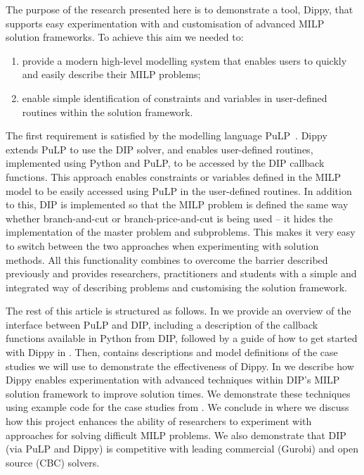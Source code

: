 The purpose of the research presented here is to demonstrate a tool, Dippy, that supports easy experimentation with and customisation of advanced \ac{MILP} solution frameworks. 
To achieve this aim we needed to:
\begin{enumerate}
\item provide a modern high-level modelling system that enables users to quickly and easily describe their \ac{MILP} problems;
\item enable simple identification of constraints and variables in user-defined routines within the solution framework.
\end{enumerate}
The first requirement is satisfied by the modelling language PuLP~\cite{pulp}.
Dippy extends PuLP to use the \ac{DIP} solver, and enables user-defined routines, implemented using Python and PuLP, to be accessed by the \ac{DIP} callback functions. This approach enables constraints or variables defined in the \ac{MILP} model to be easily accessed using PuLP in the user-defined routines.
In addition to this, \ac{DIP} is implemented so that the \ac{MILP} problem is defined the same way whether branch-and-cut or branch-price-and-cut is being used -- it hides the implementation of the master problem and subproblems.
This makes it very easy to switch between the two approaches when experimenting with solution methods.
All this functionality combines to overcome the barrier described previously and provides researchers, practitioners and students with a simple and integrated way of describing problems and customising the solution framework.

The rest of this article is structured as follows. In  we provide an overview of the interface between PuLP and \ac{DIP}, including a description of the callback functions available in Python from \ac{DIP}, followed by a guide of how to get started with Dippy in . Then,  contains descriptions and model definitions of the case studies we will use to demonstrate the effectiveness of Dippy. In  we describe how Dippy enables experimentation with advanced techniques within \ac{DIP}'s \ac{MILP} solution framework to improve solution times. We demonstrate these techniques using example code for the case studies from .
We conclude in  where we discuss how this project enhances the ability of researchers to experiment with approaches for solving difficult \ac{MILP} problems. We also demonstrate that \ac{DIP} (via PuLP and Dippy) is competitive with leading commercial (Gurobi) and open source (CBC) solvers.
